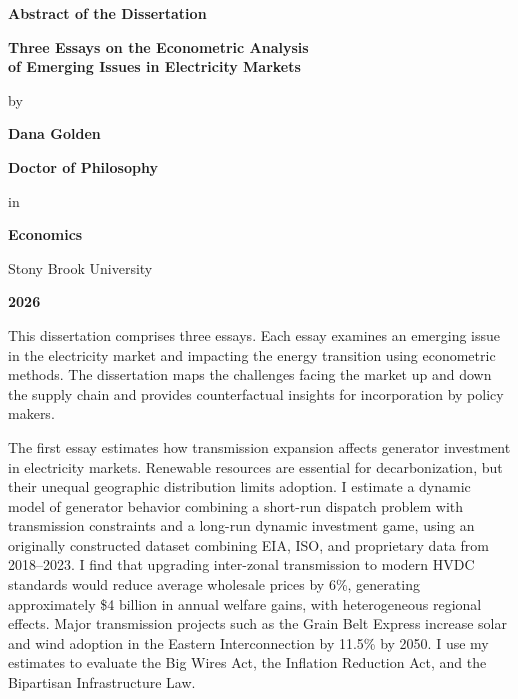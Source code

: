\clearpage
\begin{center}
{\large\bfseries Abstract of the Dissertation}

\vspace{0.3in}

{\bfseries Three Essays on the Econometric Analysis\\
of Emerging Issues in Electricity Markets}

\vspace{0.2in}

by

\vspace{0.2in}

{\bfseries Dana Golden}

\vspace{0.2in}

{\bfseries Doctor of Philosophy}

\vspace{0.1in}

in

\vspace{0.1in}

{\bfseries Economics}

\vspace{0.1in}

Stony Brook University

\vspace{0.1in}

{\bfseries 2026}
\end{center}

\vspace{0.3in}

\doublespacing
This dissertation comprises three essays. Each essay examines an emerging issue in the electricity market and impacting the energy transition using econometric methods. The dissertation maps the challenges facing the market up and down the supply chain and provides counterfactual insights for incorporation by policy makers.

The first essay estimates how transmission expansion affects generator investment in electricity markets. Renewable resources are essential for decarbonization, but their unequal geographic distribution limits adoption. I estimate a dynamic model of generator behavior combining a short-run dispatch problem with transmission constraints and a long-run dynamic investment game, using an originally constructed dataset combining EIA, ISO, and proprietary data from 2018–2023. I find that upgrading inter-zonal transmission to modern HVDC standards would reduce average wholesale prices by 6\%, generating approximately \$4 billion in annual welfare gains, with heterogeneous regional effects. Major transmission projects such as the Grain Belt Express increase solar and wind adoption in the Eastern Interconnection by 11.5\% by 2050. I use my estimates to evaluate the Big Wires Act, the Inflation Reduction Act, and the Bipartisan Infrastructure Law.


